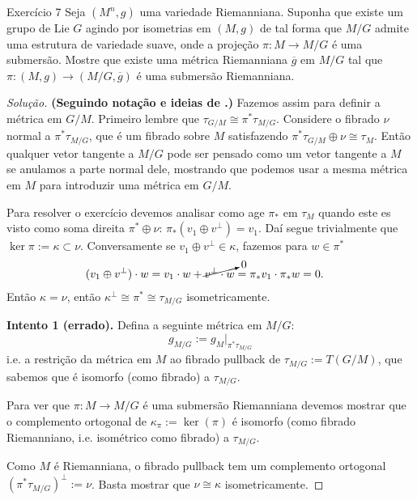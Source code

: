 \begin{thing4}{Exercício 7}\label{exer:7}\leavevmode
Seja \((M^n,g)\) uma variedade Riemanniana. Suponha que existe um grupo de Lie \(G\) agindo por isometrias em \((M,g)\) de tal forma que \(M/G\) admite uma estrutura de variedade suave, onde a projeção \(\pi:M \to M/G\) é uma submersão. Mostre que existe uma métrica Riemanniana \(\overline{g}\) em \(M/G\) tal que \(\pi:(M,g) \to (M/G,\overline{g})\) é uma submersão Riemanniana.
\end{thing4}
\begin{proof}[Solução]\leavevmode
	\textbf{(Seguindo notação e ideias de \cite{mc}.)} Fazemos assim para definir a métrica em \(G/M\). Primeiro lembre que \(\tau_{G/M} \cong \pi^*\tau_{M/G}\). Considere o fibrado \(\nu\) normal a \(\pi^*\tau_{M/G}\), que é um fibrado sobre \(M\) satisfazendo \(\pi^*\tau_{G/M}\oplus \nu\cong\tau_M\). Então qualquer vetor tangente a \(M/G\) pode ser pensado como um vetor tangente a \(M\) se anulamos a parte normal dele, mostrando que podemos usar a mesma métrica em \(M\) para introduzir uma métrica em \(G/M\).

	Para resolver o exercício devemos analisar como age \(\pi_*\) em \(\tau_M\) quando este es visto como soma direita \(\pi^*\oplus \nu\): \(\pi_*(v_1 \oplus v^\perp)=v_1\). Daí segue trivialmente que \(\ker \pi:=\kappa\subset\nu\). Conversamente se \(v_1 \oplus v^\perp \in \kappa\), fazemos para \(w \in \pi^*\)
	\begin{align*}
	(v_1 \oplus  v^\perp)\cdot w&=v_1 \cdot w+\cancelto{0}{v^\perp\cdot w}=\pi_*v_1\cdot\pi_*w=0.
\end{align*}
Então \(\kappa=\nu\), então \(\kappa^\perp\cong\pi^*\cong\tau_{M/G}\) isometricamente.

	\textbf{Intento 1 (errado).} Defina a seguinte métrica em \(M/G\):
\[g_{M/G}:=g_M|_{\pi^*\tau_{M/G}}\]
i.e. a restrição da métrica em \(M\) ao fibrado pullback de \(\tau_{M/G}:=T(G/M)\), que sabemos que é isomorfo (como fibrado) a \(\tau_{M/G}\).

Para ver que \(\pi:M\to M/G\) é uma submersão Riemanniana devemos mostrar que o complemento ortogonal de \(\kappa_\pi:=\ker(\pi)\) é isomorfo (como fibrado Riemanniano, i.e. isométrico como fibrado) a \(\tau_{M/G}\).

Como \(M\) é Riemanniana, o fibrado pullback tem um complemento ortogonal \((\pi^*\tau_{M/G})^\perp := \nu\). Basta mostrar que \(\nu \cong\kappa\) isometricamente.



\end{proof}

